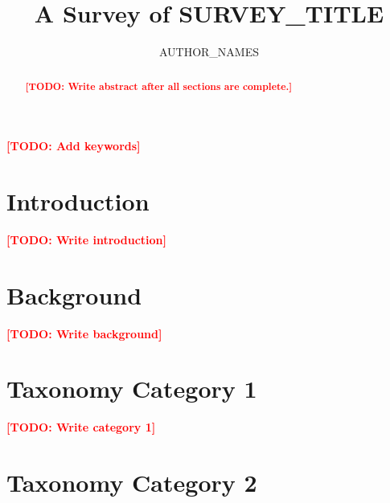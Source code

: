 \documentclass[journal]{IEEEtran}
\title{A Survey of SURVEY_TITLE}
\author{AUTHOR_NAMES}
\newcommand{\todo}[1]{\textcolor{red}{\textbf{[TODO: #1]}}}
\begin{document}
\maketitle

\begin{abstract}
\todo{Write abstract after all sections are complete.}
\end{abstract}

\begin{IEEEkeywords}
\todo{Add keywords}
\end{IEEEkeywords}

\section{Introduction}
\label{sec:introduction}

\todo{Write introduction}

\section{Background}
\label{sec:background}

\todo{Write background}

\section{Taxonomy Category 1}
\label{sec:category1}

\todo{Write category 1}

\section{Taxonomy Category 2}
\label{sec:category2}
\end{document}

